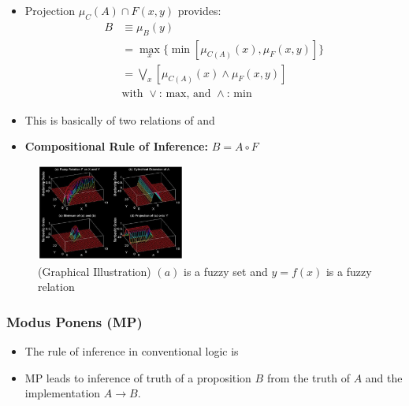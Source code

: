 \documentclass{tron}
\begin{document}
\begin{itemize}
	\item Projection $\mu_C(A)\cap F(x,y)$ provides:
	\begin{align}
		B 	& \equiv \mu_B (y)\\
			& = \underset{x}{\max}\{ \min [\mu_{C(A)}(x), \mu_F(x,y)]\} \\
			& = \underset{x}{\bigvee} [\mu_{C(A)}(x) \land \mu_F(x,y)] \label{eqn:fuzzy-reasoning:proj}\\
			& \text{with $\lor$: max, and $\land$: min}
	\end{align}
	\item This is basically  of two relations of  and 
	\item \textbf{Compositional Rule of Inference:} $B=A \circ F$
\end{itemize}

\begin{figure}[H]
	\centering
	\includegraphics[height=120px]{Figs/FuzzyInferencing/fuzzy-inf-graph}
	\caption{(Graphical Illustration) $(a)$ is a fuzzy set and $y = f ( x )$ is a fuzzy relation}
	\label{fig:fuzzy-inf:ill:ex}
\end{figure}

\subsubsection{Modus Ponens (MP)}
\begin{itemize}
	\item The rule of inference in conventional logic is 
	\item MP leads to inference of truth of a proposition $B$ from the truth of $A$ and the implementation $A\rightarrow B$.
\end{itemize}

\end{document}
